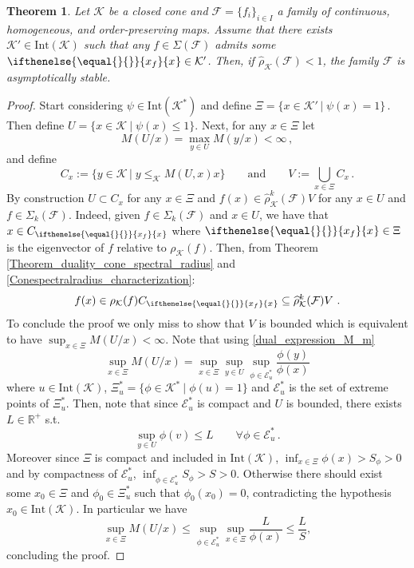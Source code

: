 \documentclass{article}
\newtheorem{theorem}{Theorem}[section]
\newcommand{\R}{\mathbb{R}}
\newcommand{\family}{\mathcal{F}}
\newcommand{\cradius}{\rho_{\cone}}
\newcommand{\cgradius}{\widehat{\rho}_{\cone}}
\newcommand{\cone}{\mathcal{K}}
\newcommand{\interior}{\mathrm{Int}}
\newcommand{\cleq}{\leq_{\cone}}
\newcommand{\ceigenvector}[1][]{
  \ifthenelse{\equal{#1}{}}
  {{x_f}}
  {{x}_{#1}}}
\begin{document}
\begin{theorem}\label{Thm_Equivalence_cone_spectral_radii_asymptotic_stability}
Let $\cone$ be a closed cone and $\family=\{f_i\}_{i\in I}$ a family of continuous, homogeneous, and order-preserving maps. Assume that there exists $\cone'\in \interior(\cone)$ such that any $f\in\Sigma(\family)$ admits some $\ceigenvector\in \cone'$. Then, if $\cgradius(\family)<1$, the family  $\family$ is asymptotically stable.
\end{theorem}
%
%
\begin{proof}
Start considering $\psi\in \interior(\cone^*)$ and define $\Xi=\{x\in \cone'\,|\; \psi(x)=1\}$\,. Then define $U=\{x\in\cone\:|\; \psi(x)\leq 1\}$.
%
Next, for any $x\in\Xi$ let
%
\begin{equation}
M(U/x)=\max_{y\in U}M(y/x)<\infty\,,
\end{equation} 
%
and define
%
\begin{equation}
C_x:=\{y\in \cone\,|\;y\cleq M(U,x)x\}\qquad \mathrm{and}\qquad V:=\bigcup_{x\in\Xi} C_x\,.
\end{equation}
By construction $U\subset C_x$ for any $x\in\Xi$ and $f(x)\in \cgradius^k(\family)V$ for any $x\in U$ and $f\in \Sigma_k(\family)$.
Indeed, given $f\in \Sigma_k(\family)$ and $x\in U$, we have that $x\in C_{\ceigenvector}$ where $\ceigenvector\in \Xi$ is the eigenvector of $f$ relative to $\cradius(f)$.  Then, from Theorem \ref{Theorem_duality_cone_spectral_radius} and \eqref{Conespectralradius_characterization}:
\begin{equation}
f(x)\in \cradius(f) C_{\ceigenvector}\subseteq \cgradius^k(\family)V\,\,.
\end{equation}
To conclude the proof we only miss to show that $V$ is bounded which is equivalent to have $\sup_{x\in\Xi}M(U/x)<\infty$. Note that using \eqref{dual_expression_M_m}
\begin{equation}
\sup_{x\in\Xi}M(U/x)=\sup_{x\in\Xi}\sup_{y\in U}\sup_{\phi\in \mathcal{E}_{u}^*}\frac{\phi(y)}{\phi(x)}
\end{equation}
where $u\in\interior(\cone)$, $\Xi_u^*=\{\phi\in\cone^*\:|\;\phi(u)=1\}$ and  $\mathcal{E}_u^*$ is the set of extreme points of $\Xi_u^*$. Then, note that since $\mathcal{E}_u^*$ is compact and $U$ is bounded, there exists $L\in \R^+$ s.t.
\begin{equation}
    \sup_{y\in U}\phi(v)\leq L \qquad \forall \phi\in \mathcal{E}_u^*\,.
\end{equation}
Moreover since $\Xi$ is compact and included in $\interior(\cone)$, $\inf_{x\in\Xi} \phi(x)>S_{\phi}>0$ and by compactness of $\mathcal{E}_u^*$, $\inf_{\phi\in\mathcal{E}_u^*} S_{\phi}>S>0$. Otherwise there should exist some $x_0\in \Xi$ and $\phi_0\in \Xi_u^*$ such that $\phi_0(x_0)=0$, contradicting the hypothesis $x_0\in \interior(\cone)$. In particular we have
\begin{equation}
\sup_{x\in\Xi}M(U/x)\leq \sup_{\phi\in \mathcal{E}_{u}^*} \sup_{x\in\Xi}\frac{L}{\phi(x)}\leq \frac{L}{S},
\end{equation}
concluding the proof.
\end{proof}
\end{document}
